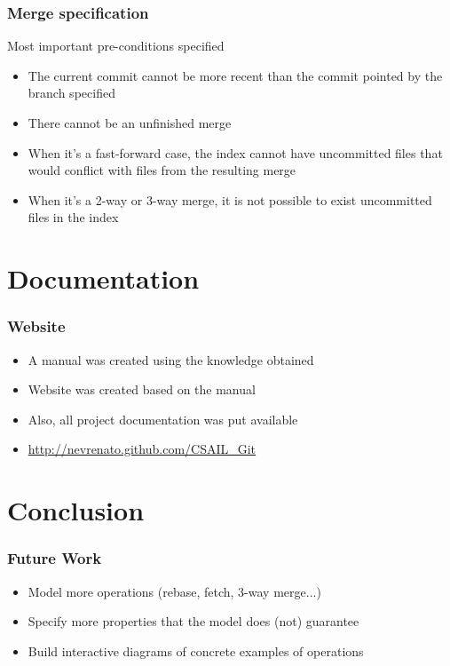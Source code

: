 \documentclass{beamer}
\begin{document}
\begin{frame}[fragile]
	\frametitle{Merge specification}
	\begin{block}{Most important pre-conditions specified}
	\begin{itemize}
		\item The current commit cannot be more recent than the commit
		pointed by the branch specified
		\item There cannot be an unfinished merge
		\item When it's a fast-forward case, the index cannot have
		uncommitted files that would conflict with files from the 
		resulting merge
		\item When it's a 2-way or 3-way merge, it is not possible
		to exist uncommitted files in the index
	\end{itemize}
	\end{block}


\end{frame}

\section{Documentation}

\begin{frame}
	\frametitle{Website}
	\begin{itemize}
	\item A manual was created using the knowledge obtained
	\item Website was created based on the manual 
	\item Also, all project documentation was put available
	\item \url{http://nevrenato.github.com/CSAIL\_Git}
	\end{itemize}

\end{frame}

\section{Conclusion}

\begin{frame}
	\frametitle{Future Work}
	\begin{itemize}
	\item Model more operations (rebase, fetch, 3-way merge...) 
	\item Specify more properties that the model does (not) guarantee
	\item Build interactive diagrams of concrete examples of operations 
	\end{itemize}
\end{frame}
\end{document}

